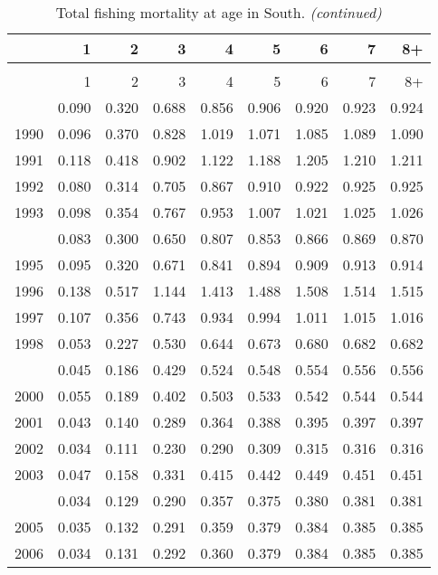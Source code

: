 \documentclass[
]{article}
\begin{document}
\begin{longtable}[t]{lrrrrrrrr}
\caption{\label{tab:South-region-FAA-table}Total fishing mortality at age in South.}\\
\toprule
  & 1 & 2 & 3 & 4 & 5 & 6 & 7 & 8+\\
\midrule
\endfirsthead
\caption[]{Total fishing mortality at age in South. \textit{(continued)}}\\
\toprule
  & 1 & 2 & 3 & 4 & 5 & 6 & 7 & 8+\\
\midrule
\endhead

\endfoot
\bottomrule
\endlastfoot
1989 & 0.090 & 0.320 & 0.688 & 0.856 & 0.906 & 0.920 & 0.923 & 0.924\\
1990 & 0.096 & 0.370 & 0.828 & 1.019 & 1.071 & 1.085 & 1.089 & 1.090\\
1991 & 0.118 & 0.418 & 0.902 & 1.122 & 1.188 & 1.205 & 1.210 & 1.211\\
1992 & 0.080 & 0.314 & 0.705 & 0.867 & 0.910 & 0.922 & 0.925 & 0.925\\
1993 & 0.098 & 0.354 & 0.767 & 0.953 & 1.007 & 1.021 & 1.025 & 1.026\\
\addlinespace
1994 & 0.083 & 0.300 & 0.650 & 0.807 & 0.853 & 0.866 & 0.869 & 0.870\\
1995 & 0.095 & 0.320 & 0.671 & 0.841 & 0.894 & 0.909 & 0.913 & 0.914\\
1996 & 0.138 & 0.517 & 1.144 & 1.413 & 1.488 & 1.508 & 1.514 & 1.515\\
1997 & 0.107 & 0.356 & 0.743 & 0.934 & 0.994 & 1.011 & 1.015 & 1.016\\
1998 & 0.053 & 0.227 & 0.530 & 0.644 & 0.673 & 0.680 & 0.682 & 0.682\\
\addlinespace
1999 & 0.045 & 0.186 & 0.429 & 0.524 & 0.548 & 0.554 & 0.556 & 0.556\\
2000 & 0.055 & 0.189 & 0.402 & 0.503 & 0.533 & 0.542 & 0.544 & 0.544\\
2001 & 0.043 & 0.140 & 0.289 & 0.364 & 0.388 & 0.395 & 0.397 & 0.397\\
2002 & 0.034 & 0.111 & 0.230 & 0.290 & 0.309 & 0.315 & 0.316 & 0.316\\
2003 & 0.047 & 0.158 & 0.331 & 0.415 & 0.442 & 0.449 & 0.451 & 0.451\\
\addlinespace
2004 & 0.034 & 0.129 & 0.290 & 0.357 & 0.375 & 0.380 & 0.381 & 0.381\\
2005 & 0.035 & 0.132 & 0.291 & 0.359 & 0.379 & 0.384 & 0.385 & 0.385\\
2006 & 0.034 & 0.131 & 0.292 & 0.360 & 0.379 & 0.384 & 0.385 & 0.385\\

\end{longtable}
\end{document}
